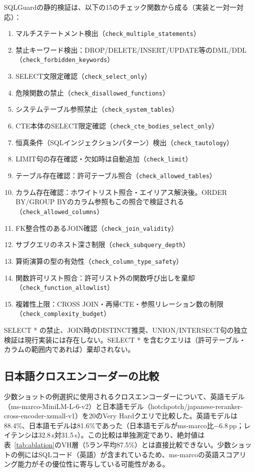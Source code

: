 \documentclass[twocolumn]{interact}
\begin{document}
SQLGuardの静的検証は、以下の15のチェック関数から成る（実装と一対一対応）：

\begin{enumerate}[nosep]
  \item マルチステートメント検出（\texttt{check\_multiple\_statements}）
  \item 禁止キーワード検出：DROP/DELETE/INSERT/UPDATE等のDML/DDL（\texttt{check\_forbidden\_keywords}）
  \item SELECT文限定確認（\texttt{check\_select\_only}）
  \item 危険関数の禁止（\texttt{check\_disallowed\_functions}）
  \item システムテーブル参照禁止（\texttt{check\_system\_tables}）
  \item CTE本体のSELECT限定確認（\texttt{check\_cte\_bodies\_select\_only}）
  \item 恒真条件（SQLインジェクションパターン）検出（\texttt{check\_tautology}）
  \item LIMIT句の存在確認・欠如時は自動追加（\texttt{check\_limit}）
  \item テーブル存在確認：許可テーブル照合（\texttt{check\_allowed\_tables}）
  \item カラム存在確認：ホワイトリスト照合・エイリアス解決後。ORDER BY/GROUP BYのカラム参照もこの照合で検証される（\texttt{check\_allowed\_columns}）
  \item FK整合性のあるJOIN確認（\texttt{check\_join\_validity}）
  \item サブクエリのネスト深さ制限（\texttt{check\_subquery\_depth}）
  \item 算術演算の型の有効性（\texttt{check\_column\_type\_safety}）
  \item 関数許可リスト照合：許可リスト外の関数呼び出しを棄却（\texttt{check\_function\_allowlist}）
  \item 複雑性上限：CROSS JOIN・再帰CTE・参照リレーション数の制限（\texttt{check\_complexity\_budget}）
\end{enumerate}

SELECT * の禁止、JOIN時のDISTINCT推奨、UNION/INTERSECT句の独立検証は現行実装には存在しない。SELECT * を含むクエリは（許可テーブル・カラムの範囲内であれば）棄却されない。

\subsection{日本語クロスエンコーダーの比較}

少数ショットの例選択に使用されるクロスエンコーダーについて、英語モデル（ms-marco-MiniLM-L-6-v2）と日本語モデル（hotchpotch/japanese-reranker-cross-encoder-xsmall-v1）を20のVery Hardクエリで比較した。英語モデルは88.4\%、日本語モデルは81.6\%であった（日本語モデルがms-marco比$-$6.8\,pp；レイテンシは32.8\,s対31.5\,s）。この比較は単独測定であり、絶対値は表~\ref{tab:ablation}のVH層（5ラン平均87.5\%）とは直接比較できない。少数ショットの例にはSQLコード（英語）が含まれているため、ms-marcoの英語スコアリング能力がその優位性に寄与している可能性がある。
\end{document}
